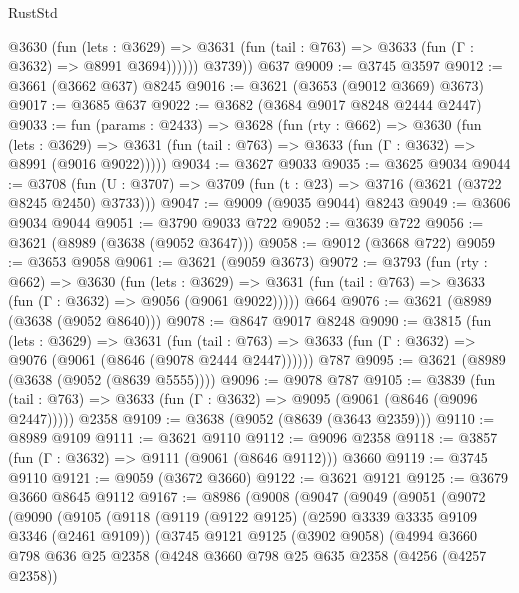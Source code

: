 \begin{lexlean}{RustStd}
\begin{coremodule}
            @3630
              (fun (lets : @3629) =>
              @3631 (fun (tail : @763) => @3633 (fun (Γ : @3632) => @8991 @3694))))))
        @3739))
    @637
@9009 := @3745 @3597
@9012 := @3661 (@3662 @637) @8245
@9016 := @3621 (@3653 (@9012 @3669) @3673)
@9017 := @3685 @637
@9022 := @3682 (@3684 @9017 @8248 @2444 @2447)
@9033 := fun (params : @2433) =>
  @3628
    (fun (rty : @662) =>
    @3630
      (fun (lets : @3629) =>
      @3631 (fun (tail : @763) => @3633 (fun (Γ : @3632) => @8991 (@9016 @9022)))))
@9034 := @3627 @9033
@9035 := @3625 @9034
@9044 := @3708 (fun (U : @3707) => @3709 (fun (t : @23) => @3716 (@3621 (@3722 @8245 @2450) @3733)))
@9047 := @9009 (@9035 @9044) @8243
@9049 := @3606 @9034 @9044
@9051 := @3790 @9033 @722
@9052 := @3639 @722
@9056 := @3621 (@8989 (@3638 (@9052 @3647)))
@9058 := @9012 (@3668 @722)
@9059 := @3653 @9058
@9061 := @3621 (@9059 @3673)
@9072 := @3793
    (fun (rty : @662) =>
    @3630
      (fun (lets : @3629) =>
      @3631 (fun (tail : @763) => @3633 (fun (Γ : @3632) => @9056 (@9061 @9022)))))
    @664
@9076 := @3621 (@8989 (@3638 (@9052 @8640)))
@9078 := @8647 @9017 @8248
@9090 := @3815
    (fun (lets : @3629) =>
    @3631
      (fun (tail : @763) => @3633 (fun (Γ : @3632) => @9076 (@9061 (@8646 (@9078 @2444 @2447))))))
    @787
@9095 := @3621 (@8989 (@3638 (@9052 (@8639 @5555))))
@9096 := @9078 @787
@9105 := @3839
    (fun (tail : @763) => @3633 (fun (Γ : @3632) => @9095 (@9061 (@8646 (@9096 @2447)))))
    @2358
@9109 := @3638 (@9052 (@8639 (@3643 @2359)))
@9110 := @8989 @9109
@9111 := @3621 @9110
@9112 := @9096 @2358
@9118 := @3857 (fun (Γ : @3632) => @9111 (@9061 (@8646 @9112))) @3660
@9119 := @3745 @9110
@9121 := @9059 (@3672 @3660)
@9122 := @3621 @9121
@9125 := @3679 @3660 @8645 @9112
@9167 := @8986
    (@9008
      (@9047
        (@9049
          (@9051
            (@9072
              (@9090
                (@9105
                  (@9118
                    (@9119
                      (@9122 @9125)
                      (@2590 @3339 @3335 @9109 @3346 (@2461 @9109))
                      (@3745
                        @9121
                        @9125
                        (@3902 @9058)
                        (@4994
                          @3660
                          @798
                          @636
                          @25
                          @2358
                          (@4248
                            @3660
                            @798
                            @25
                            @635
                            @2358
                            (@4256 (@4257 @2358))

\end{coremodule}
\end{lexlean}
